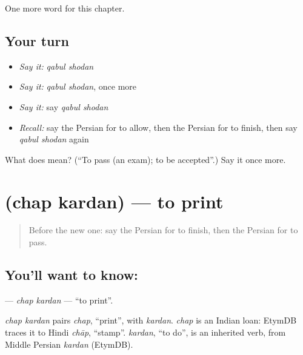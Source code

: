 \begin{grammarlens}[title={What you've built}]
One more word for this chapter.
\end{grammarlens}

\subsection*{Your turn}
\begin{itemize}
\raggedright
  \item \emph{Say it:} \emph{qabul shodan}
  \item \emph{Say it:} \emph{qabul shodan}, once more
  \item \emph{Say it:} say \emph{qabul shodan}
  \item \emph{Recall:} say the Persian for to allow, then the Persian for to finish, then say \emph{qabul shodan} again
\end{itemize}

\begin{tcolorbox}[breakable,colback=teal!4,colframe=teal!35!black,title={Before you move on}]
What does   mean? (\textquotedblleft{}To pass (an exam); to be accepted\textquotedblright{}.) Say it once more.
\end{tcolorbox}
\section[\texorpdfstring{\fa{چاپ} \fa{کردن} (chap kardan)}{چاپ کردن (chap kardan)}]{  (chap kardan) — to print}

\label{lesson:FA-C220-chap-kardan}



\begin{quote}
Before the new one: say the Persian for to finish, then the Persian for to pass.
\end{quote}

\subsection*{You'll want to know:  }
\textbf{ } — \emph{chap kardan} — \textquotedblleft{}to print\textquotedblright{}.

\begin{cousinweb}
\emph{chap kardan} pairs \emph{chap}, \textquotedblleft{}print\textquotedblright{}, with \emph{kardan}. \emph{chap} is an Indian loan: EtymDB traces it to Hindi \emph{chāp}, \textquotedblleft{}stamp\textquotedblright{}. \emph{kardan}, \textquotedblleft{}to do\textquotedblright{}, is an inherited verb, from Middle Persian \emph{kardan} (EtymDB).
\end{cousinweb}

